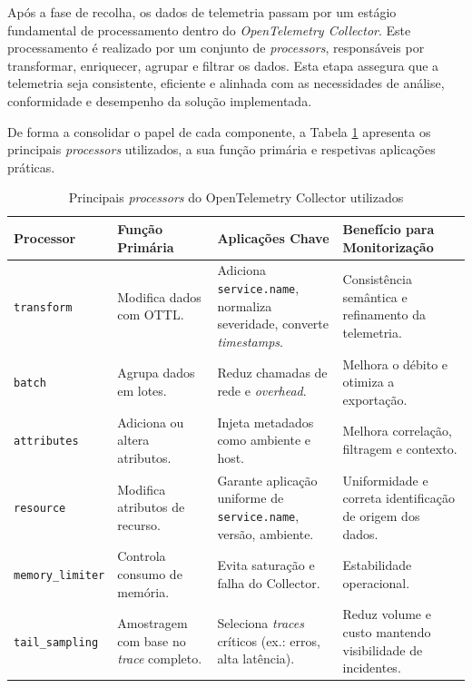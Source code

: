 Após a fase de recolha, os dados de telemetria passam por um estágio fundamental de processamento dentro do \textit{OpenTelemetry Collector}. Este processamento é realizado por um conjunto de \textit{processors}, responsáveis por transformar, enriquecer, agrupar e filtrar os dados. Esta etapa assegura que a telemetria seja consistente, eficiente e alinhada com as necessidades de análise, conformidade e desempenho da solução implementada.

De forma a consolidar o papel de cada componente, a Tabela \ref{tab:otel-processors} apresenta os principais \textit{processors} utilizados, a sua função primária e respetivas aplicações práticas.



\begin{table}[H]
\centering
\caption{Principais \textit{processors} do OpenTelemetry Collector utilizados}
\label{tab:otel-processors}
\begin{tabular}{|p{2.7cm}|p{3.5cm}|p{4.2cm}|p{4.2cm}|}
\hline
\textbf{Processor} & \textbf{Função Primária} & \textbf{Aplicações Chave} & \textbf{Benefício para Monitorização} \\ \hline
\texttt{transform} & Modifica dados com OTTL. & Adiciona \texttt{service.name}, normaliza severidade, converte \textit{timestamps}. & Consistência semântica e refinamento da telemetria. \\ \hline
\texttt{batch} & Agrupa dados em lotes. & Reduz chamadas de rede e \textit{overhead}. & Melhora o débito e otimiza a exportação. \\ \hline
\texttt{attributes} & Adiciona ou altera atributos. & Injeta metadados como ambiente e host. & Melhora correlação, filtragem e contexto. \\ \hline
\texttt{resource} & Modifica atributos de recurso. & Garante aplicação uniforme de \texttt{service.name}, versão, ambiente. & Uniformidade e correta identificação de origem dos dados. \\ \hline
\texttt{memory\_limiter} & Controla consumo de memória. & Evita saturação e falha do Collector. & Estabilidade operacional. \\ \hline
\texttt{tail\_sampling} & Amostragem com base no \textit{trace} completo. & Seleciona \textit{traces} críticos (ex.: erros, alta latência). & Reduz volume e custo mantendo visibilidade de incidentes. \\ \hline
\end{tabular}
\end{table}

